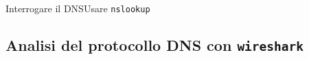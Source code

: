 \documentclass[italian]{beamer}
\begin{document}
\begin{frame}{Interrogare il DNS}{Usare \texttt{nslookup}}

\end{frame}


\subsection[Lab 2: wireshark]{Analisi del protocollo DNS con \texttt{wireshark}}
\end{document}
